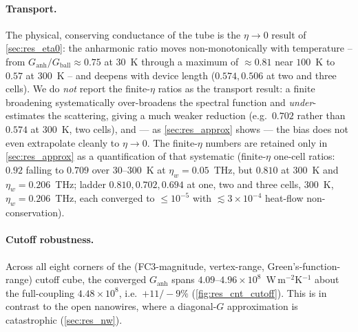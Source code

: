 \paragraph{Transport.} The physical, conserving conductance of the tube is the
$\eta\to0$ result of \cref{sec:res_eta0}: the anharmonic ratio moves
non-monotonically with temperature -- from
$G_\mathrm{anh}/G_\mathrm{ball}\approx0.75$ at $30$~K through a maximum of
$\approx0.81$ near $100$~K to $0.57$ at $300$~K -- and
deepens with device length ($0.574,0.506$ at two and three cells). We do
\emph{not} report the finite-$\eta$ ratios as the transport result: a finite
broadening systematically over-broadens the spectral function and
\emph{under}-estimates the scattering, giving a much weaker reduction (e.g.\
$0.702$ rather than $0.574$ at $300$~K, two cells), and --- as
\cref{sec:res_approx} shows --- the bias does not even extrapolate cleanly to
$\eta\to0$. The finite-$\eta$ numbers are retained only in \cref{sec:res_approx}
as a quantification of that systematic (finite-$\eta$ one-cell ratios: $0.92$
falling to $0.709$ over $30$--$300$~K at $\eta_w=0.05$~THz, but $0.810$ at
$300$~K and $\eta_w=0.206$~THz; ladder $0.810,0.702,0.694$ at one, two and
three cells, $300$~K, $\eta_w=0.206$~THz, each converged to $\le10^{-5}$ with
$\lesssim3\times10^{-4}$ heat-flow non-conservation).

\paragraph{Cutoff robustness.}  Across all eight corners of the
(FC3-magnitude, vertex-range, Green's-function-range) cutoff cube,
the converged $G_\mathrm{anh}$ spans $4.09$--$4.96\times10^{8}$~W\,m$^{-2}$K$^{-1}$
about the full-coupling $4.48\times10^{8}$, i.e.\ $+11/{-}9\%$
(\cref{fig:res_cnt_cutoff}). This is in contrast to the open
nanowires, where a diagonal-$G$ approximation is
catastrophic (\cref{sec:res_nw}).

